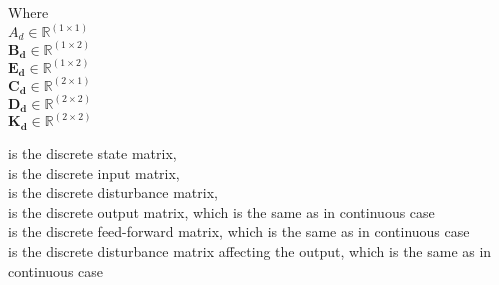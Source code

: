 \begin{minipage}[t]{0.20\textwidth}
Where\\
\hspace*{8mm} $A_d \in \mathbb{R}^{(1 \times 1)}$ \\
\hspace*{8mm} $\bm{B_d} \in \pmb{\mathbb{R}}^{(1 \times 2)}$ \\
\hspace*{8mm} $\bm{E_d} \in \pmb{\mathbb{R}}^{(1 \times 2)}$ \\
\hspace*{8mm} $\bm{C_d} \in \pmb{\mathbb{R}}^{(2 \times 1)}$ \\
\newline
\hspace*{8mm} $\bm{D_d} \in \pmb{\mathbb{R}}^{(2 \times 2)}$ \\
\newline
\hspace*{8mm} $\bm{K_d} \in \pmb{\mathbb{R}}^{(2 \times 2)}$ 
\end{minipage}
\begin{minipage}[t]{0.68\textwidth}
\vspace*{2mm}
is the discrete state matrix, \\
is the discrete input matrix, \\
is the discrete disturbance matrix, \\ 
is the discrete output matrix, which is the same as in continuous case \\
is the discrete feed-forward matrix, which is the same as in continuous case \\
is the discrete disturbance matrix affecting the output, which is the same as in continuous case \\
\end{minipage}


